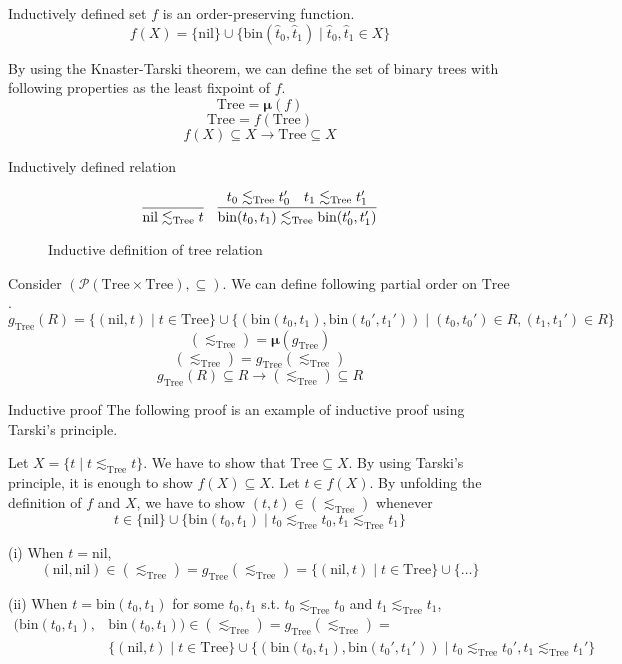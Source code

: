 \documentclass[9pt]{beamer}
\newcommand\pow[1]{\mathcal{P}(#1)}
\newcommand\Tree[0]{\text{Tree}}
\newcommand\nil[0]{\text{nil}}
\newcommand\bin[0]{\text{bin}}
\newcommand\fix[0]{\boldsymbol{\mu}}
\begin{document}
\begin{frame}{Inductively defined set}
  $f$ is an order-preserving function.
  $$ f(X) = \{\nil\} \cup \{\bin(\hat t_0, \hat t_1) \mid \hat t_0, \hat t_1 \in X\} $$

  By using the Knaster-Tarski theorem, we can define the set of binary trees with following properties
  as the least fixpoint of $f$.
  $$ \Tree = \fix(f) $$
  $$ \Tree = f(\Tree) $$
  $$ f(X) \subseteq X \to \Tree \subseteq X $$
\end{frame}

\begin{frame}{Inductively defined relation}
  \begin{figure}
  \[
    \infer
    {\nil \lesssim_{\Tree} t}
    {}
    \quad
    \infer
    {\bin(t_0,t_1) \lesssim_{\Tree} \bin(t_0',t_1')}
    {t_0 \lesssim_{\Tree} t_0' & t_1 \lesssim_{\Tree} t_1'}
  \]
  \caption{Inductive definition of tree relation}
  \end{figure}

  Consider $(\pow{\Tree \times \Tree}, \subseteq)$.
  We can define following partial order on $\Tree$.
  $$ g_{\Tree}(R) =
    \{(\nil,t) \mid t \in \Tree\} \cup
    \{(\bin(t_0, t_1), \bin(t_0', t_1')) \mid (t_0, t_0') \in R, (t_1, t_1') \in R \}
  $$
  $$ (\lesssim_{\Tree}) = \fix(g_{\Tree}) $$
  $$ (\lesssim_{\Tree}) = g_{\Tree}(\lesssim_{\Tree}) $$
  $$ g_{\Tree}(R) \subseteq R \to (\lesssim_{\Tree}) \subseteq R $$
\end{frame}

\begin{frame}{Inductive proof}
  The following proof is an example of inductive proof using Tarski's principle.
  \begin{example}[Reflexivity of $\lesssim_{\Tree}$]
    Let $X = \{t \mid t \lesssim_{\Tree} t\}$. We have to show that $\Tree \subseteq X$.
    By using Tarski's principle, it is enough to show $f(X) \subseteq X$.
    Let $t \in f(X)$. By unfolding the definition of $f$ and $X$,
    we have to show $(t,t) \in (\lesssim_{\Tree})$ whenever
    $$ t \in \{\nil\} \cup \{\bin(t_0, t_1) \mid t_0 \lesssim_{\Tree} t_0, t_1 \lesssim_{\Tree} t_1\} $$

    (i) When $t = \nil$,
        $$ (\nil, \nil) \in (\lesssim_{\Tree}) = g_{\Tree}(\lesssim_{\Tree}) = 
           \{(\nil,t) \mid t \in \Tree\} \cup \{ \ldots \}
        $$

    (ii) When $t = \bin(t_0, t_1)$ for some $t_0, t_1$ s.t. $t_0 \lesssim_{\Tree} t_0$ and $t_1 \lesssim_{\Tree} t_1$,
        $$
          \begin{aligned}
            (\bin(t_0, t_1), & \bin(t_0, t_1)) \in (\lesssim_{\Tree}) = g_{\Tree}(\lesssim_{\Tree}) = \\
            & \{(\nil,t) \mid t \in \Tree\} \cup
              \{(\bin(t_0, t_1), \bin(t_0', t_1')) \mid t_0 \lesssim_{\Tree} t_0', t_1 \lesssim_{\Tree} t_1' \}
          \end{aligned}
        $$
  \end{example}
\end{frame}
\end{document}
